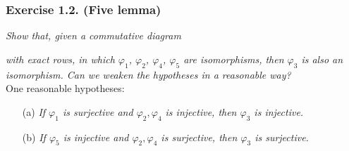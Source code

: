\documentclass{article}
\begin{document}



\subsubsection*{Exercise 1.2. (Five lemma)}
\emph{Show that, given a commutative diagram}
\begin{center}
\end{center}
\emph{with exact rows, in which $\varphi_1$, $\varphi_2$, $\varphi_4$, $\varphi_5$ are isomorphisms,
then $\varphi_3$ is also an isomorphism.
Can we weaken the hypotheses in a reasonable way?} \\



One reasonable hypotheses:
\begin{enumerate}
\item[(a)]
  \emph{If $\varphi_1$ is surjective and $\varphi_2, \varphi_4$ is injective,
  then $\varphi_3$ is injective.}

\item[(b)]
  \emph{If $\varphi_5$ is injective and $\varphi_2, \varphi_4$ is surjective,
  then $\varphi_3$ is surjective.} \\
\end{enumerate}
\end{document}
